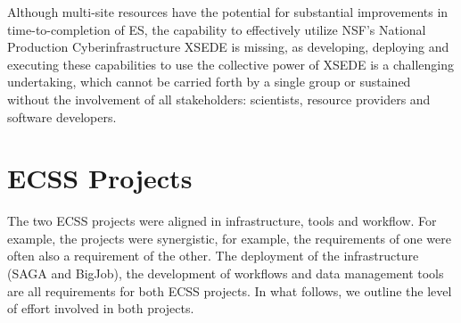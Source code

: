 \documentclass{sig-alternate}
\begin{document}
Although multi-site resources have the potential for substantial
improvements in time-to-completion of ES, the capability to
effectively utilize NSF's National Production Cyberinfrastructure
XSEDE is missing, as developing, deploying and executing these
capabilities to use the collective power of XSEDE is a challenging
undertaking, which cannot be carried forth by a single group or
sustained without the involvement of all stakeholders: scientists,
resource providers and software developers.

\section{ECSS Projects}

   

The two ECSS projects were aligned in infrastructure, tools and
workflow.  For example, the projects were synergistic, for example,
the requirements of one were often also a requirement of the
other. The deployment of the infrastructure (SAGA and BigJob), the
development of workflows and data management tools are all
requirements for both ECSS projects. In what follows, we outline the
level of effort involved in both projects.

% 
% 
% 
% 
% 
\end{document}
